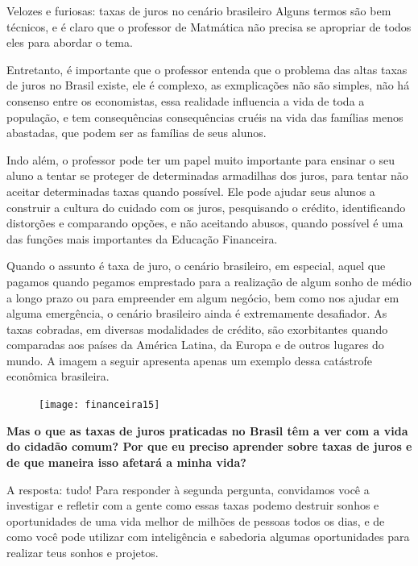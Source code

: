 \begin{paginatexto}{Velozes e furiosas: taxas de juros no cenário brasileiro}
Alguns termos são bem técnicos, e é claro que o professor de Matmática não precisa se apropriar de todos eles para abordar o tema.

Entretanto, é importante que o professor entenda que o problema das altas taxas de juros no Brasil existe, ele é complexo, as exmplicações não são simples, não há consenso entre os economistas, essa realidade influencia a vida de toda a população, e tem consequências consequências cruéis na vida das famílias menos abastadas, que podem ser as famílias de seus alunos.

Indo além, o professor pode ter um papel muito importante para ensinar o seu aluno a tentar se proteger de determinadas armadilhas dos juros, para tentar não aceitar determinadas taxas quando possível. Ele pode ajudar seus alunos a construir a cultura do cuidado com os juros, pesquisando o crédito, identificando distorções e comparando opções, e não aceitando abusos, quando possível é uma das funções mais importantes da Educação Financeira.

\end{paginatexto}

\def\currentcolor{session1}



\label{fin-exp-6}

Quando o assunto é taxa de juro, o cenário brasileiro, em  especial, aquel que pagamos quando pegamos emprestado para a realização de algum sonho de médio a longo prazo ou para empreender em algum negócio, bem como nos ajudar em alguma emergência, o cenário brasileiro ainda é extremamente desafiador. As taxas cobradas, em diversas modalidades de crédito, são exorbitantes quando comparadas aos países da América Latina, da Europa e de outros lugares do mundo. A imagem a seguir apresenta apenas um exemplo dessa catástrofe econômica brasileira.

\begin{figure}[H]
\centering

\texttt{[image: financeira15]}
\end{figure}


\textbf{Mas o que as taxas de juros praticadas no Brasil têm a ver com a vida do cidadão comum? Por que eu preciso aprender sobre taxas de juros e de que maneira isso afetará a minha vida?}

A resposta: tudo! Para responder à segunda pergunta, convidamos você a investigar e refletir com a gente como essas taxas podemo destruir sonhos e oportunidades de uma vida melhor de milhões de pessoas todos os dias, e de como você pode utilizar com inteligência e sabedoria algumas oportunidades para realizar teus sonhos e projetos.

